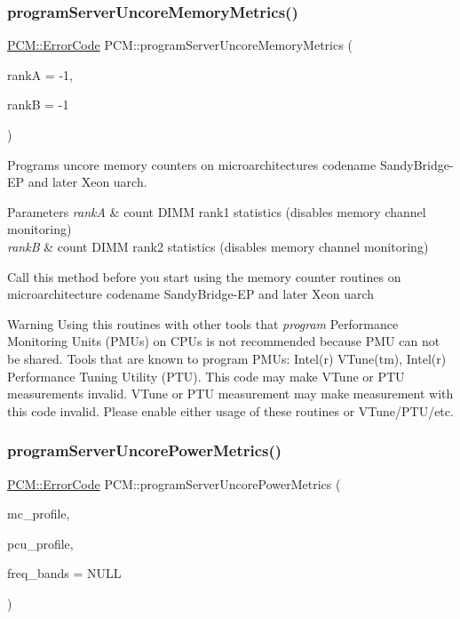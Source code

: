 \subsubsection{\texorpdfstring{program\+Server\+Uncore\+Memory\+Metrics()}{programServerUncoreMemoryMetrics()}}
{\footnotesize\ttfamily \mbox{\hyperlink{class_p_c_m_abebf5f22d794719dfc49155741e264e5}{P\+C\+M\+::\+Error\+Code}} P\+C\+M\+::program\+Server\+Uncore\+Memory\+Metrics (\begin{DoxyParamCaption}\item[{int}]{rankA = {\ttfamily -\/1},  }\item[{int}]{rankB = {\ttfamily -\/1} }\end{DoxyParamCaption})}



Programs uncore memory counters on microarchitectures codename Sandy\+Bridge-\/\+EP and later Xeon uarch. 


\begin{DoxyParams}{Parameters}
{\em rankA} & count D\+I\+MM rank1 statistics (disables memory channel monitoring) \\
\hline
{\em rankB} & count D\+I\+MM rank2 statistics (disables memory channel monitoring)\\
\hline
\end{DoxyParams}
Call this method before you start using the memory counter routines on microarchitecture codename Sandy\+Bridge-\/\+EP and later Xeon uarch

\begin{DoxyWarning}{Warning}
Using this routines with other tools that {\itshape program} Performance Monitoring Units (P\+M\+Us) on C\+P\+Us is not recommended because P\+MU can not be shared. Tools that are known to program P\+M\+Us\+: Intel(r) V\+Tune(tm), Intel(r) Performance Tuning Utility (P\+TU). This code may make V\+Tune or P\+TU measurements invalid. V\+Tune or P\+TU measurement may make measurement with this code invalid. Please enable either usage of these routines or V\+Tune/\+P\+T\+U/etc. 
\end{DoxyWarning}
\mbox{\label{class_p_c_m_a3a30cec6e4e7a78ec964d194e3844637}} 
\subsubsection{\texorpdfstring{program\+Server\+Uncore\+Power\+Metrics()}{programServerUncorePowerMetrics()}}
{\footnotesize\ttfamily \mbox{\hyperlink{class_p_c_m_abebf5f22d794719dfc49155741e264e5}{P\+C\+M\+::\+Error\+Code}} P\+C\+M\+::program\+Server\+Uncore\+Power\+Metrics (\begin{DoxyParamCaption}\item[{int}]{mc\+\_\+profile,  }\item[{int}]{pcu\+\_\+profile,  }\item[{int $\ast$}]{freq\+\_\+bands = {\ttfamily NULL} }\end{DoxyParamCaption})}



